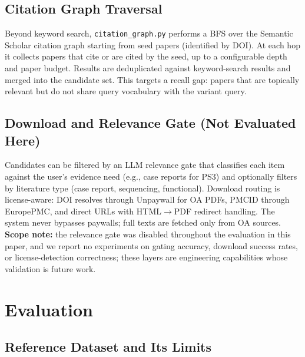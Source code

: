\documentclass[sigconf,screen]{acmart}
\begin{document}
\subsection{Citation Graph Traversal}
\label{sec:citation}

Beyond keyword search, \texttt{citation\_graph.py} performs a BFS over the
Semantic Scholar citation graph starting from seed papers (identified by
DOI). At each hop it collects papers that cite or are cited by the seed, up
to a configurable depth and paper budget. Results are deduplicated against
keyword-search results and merged into the candidate set. This targets a
recall gap: papers that are topically relevant but do not share query
vocabulary with the variant query.

\subsection{Download and Relevance Gate (Not Evaluated Here)}
\label{sec:download}

Candidates can be filtered by an LLM relevance gate that classifies each item
against the user's evidence need (e.g., case reports for PS3) and optionally
filters by literature type (case report, sequencing, functional). Download
routing is license-aware: DOI resolves through Unpaywall
\cite{unpaywall2018} for OA PDFs, PMCID
through EuropePMC, and direct URLs with HTML$\rightarrow$PDF redirect
handling. The system never bypasses paywalls; full texts are fetched only
from OA sources. \textbf{Scope note:} the relevance gate was disabled
throughout the evaluation in this paper, and we report no experiments on
gating accuracy, download success rates, or license-detection correctness;
these layers are engineering capabilities whose validation is future work.

\section{Evaluation}
\label{sec:eval}

\subsection{Reference Dataset and Its Limits}
\label{sec:goldstd}
\end{document}
